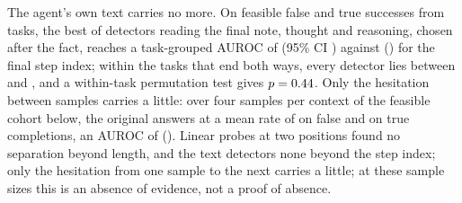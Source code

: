 The agent's own text carries no more. On \tsNFs{} feasible false and \tsNTrue{} true successes from \tsNTasks{} tasks, the best of \tsNModels{} detectors reading the final note, thought and reasoning, chosen after the fact, reaches a task-grouped AUROC of \tsBestAuc{} (95\% CI \tsBestCi) against \tsStepAuc{} (\tsStepCi) for the final step index; within the \tsMixed{} tasks that end both ways, every detector lies between \tsMixedMin{} and \tsMixedMax, and a within-task permutation test gives $p=0.44$. Only the hesitation between samples carries a little: over four samples per context of the feasible cohort below, the original answers at a mean rate of \tsConsRateFs{} on false and \tsConsRateTrue{} on true completions, an AUROC of \tsConsAuc{} (\tsConsCi). Linear probes at two positions found no separation beyond length, and the text detectors none beyond the step index; only the hesitation from one sample to the next carries a little; at these sample sizes this is an absence of evidence, not a proof of absence. %

